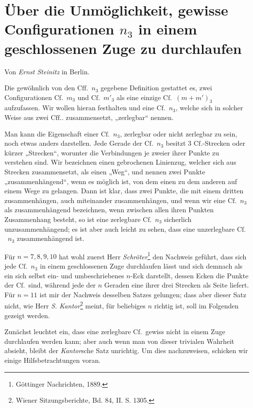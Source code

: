 \documentclass[11pt,a4paper]{article}
\begin{document}
\newcommand{\Cf}{\ensuremath{\mathrm{Cf.}}}
\newcommand{\Cff}{\ensuremath{\mathrm{Cff.}}}

\section*{Über die Unmöglichkeit, gewisse Configurationen $n_3$ in einem geschlossenen Zuge zu durchlaufen}
\begin{center}
Von \emph{Ernst Steinitz} in Berlin.
\end{center}

Die gewöhnlich von den \Cff\ $n_3$ gegebene Definition gestattet es, zwei Configurationen \Cf\ $m_3$ und \Cf\ $m'_3$ als eine einzige \Cf\ $(m+m')_3$ aufzufassen. Wir wollen hieran festhalten und eine \Cf\ $n_3$, welche sich in solcher Weise aus zwei \Cff. zusammensetzt, „zerlegbar“ nennen.

Man kann die Eigenschaft einer \Cf\ $n_3$, zerlegbar oder nicht zerlegbar zu sein, noch etwas anders darstellen. Jede Gerade der \Cf\ $n_3$ besitzt 3 \Cf-Strecken oder kürzer „Strecken“, worunter die Verbindungen je zweier ihrer Punkte zu verstehen sind. Wir bezeichnen einen gebrochenen Linienzug, welcher sich aus Strecken zusammensetzt, als einen „Weg“, und nennen zwei Punkte „zusammenhängend“, wenn es möglich ist, von dem einen zu dem anderen auf einem Wege zu gelangen. Dann ist klar, dass zwei Punkte, die mit einem dritten zusammenhängen, auch miteinander zusammenhängen, und wenn wir eine \Cf\ $n_3$ als zusammenhängend bezeichnen, wenn zwischen allen ihren Punkten Zusammenhang besteht, so ist eine zerlegbare \Cf\ $n_3$ sicherlich unzusammenhängend; es ist aber auch leicht zu sehen, dass eine unzerlegbare \Cf\ $n_3$ zusammenhängend ist.

Für $n=7,8,9,10$ hat wohl zuerst Herr \emph{Schröter}\footnote{Göttinger Nachrichten, 1889.} den Nachweis geführt, dass sich jede \Cf\ $n_3$ in einem geschlossenen Zuge durchlaufen lässt und sich demnach als ein sich selbst ein- und umbeschriebenes $n$-Eck darstellt, dessen Ecken die Punkte der \Cf\ sind, während jede der $n$ Geraden eine ihrer drei Strecken als Seite liefert. Für $n=11$ ist mir der Nachweis desselben Satzes gelungen; dass aber dieser Satz nicht, wie Herr \emph{S. Kantor}\footnote{Wiener Sitzungsberichte, Bd. 84, II. S. 1305.} meint, für beliebiges $n$ richtig ist, soll im Folgenden gezeigt werden.

Zunächst leuchtet ein, dass eine zerlegbare \Cf\ gewiss nicht in einem Zuge durchlaufen werden kann; aber auch wenn man von dieser trivialen Wahrheit absieht, bleibt der \emph{Kantor}sche Satz unrichtig. Um dies nachzuweisen, schicken wir einige Hilfsbetrachtungen voran.
\end{document}
